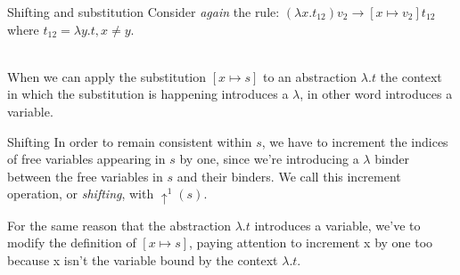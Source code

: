 \documentclass[8pt]{beamer}
\begin{document}
\begin{frame}{Shifting and substitution}
    Consider \emph{again} the rule:
        $(\lambda x.t_{12})v_{2} \rightarrow [x \mapsto v_{2}]t_{12}$ 
        where $t_{12} = \lambda y.t, x\not=y$.
    \\~\\
    \pause
    
    When we can apply the substitution $[x \mapsto s]$ to an abstraction $\lambda.t$
    the context in which the substitution is happening introduces a $\lambda$, 
    in other word introduces a variable. \\
    \begin{block}{Shifting}
        In order to remain consistent within $s$, we have to increment the indices of 
        free variables appearing in $s$ by one, since we're introducing a 
        $\lambda$ binder between the free variables in $s$ and their binders.
        We call this increment operation, or \emph{shifting}, with $\uparrow^{1}(s)$.
    \end{block}
    \pause
    For the same reason that the abstraction $\lambda.t$ introduces a variable,
    we've to modify the definition of $[x \mapsto s]$, paying attention to increment
    x by one too because x isn't the variable bound by the context $\lambda.t$.
\end{frame}
\end{document}
